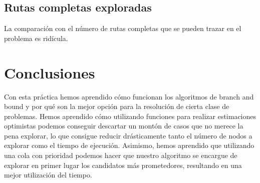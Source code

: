 \documentclass[a4paper, 11pt]{article}
\begin{document}
\subsection{Rutas completas exploradas}
La comparación con el número de rutas completas que se pueden trazar en el problema es ridícula.

\section{Conclusiones}
Con esta práctica hemos aprendido cómo funcionan los algoritmos de branch and bound y por qué son la mejor opción para la resolución de cierta clase de problemas. Hemos aprendido cómo utilizando funciones para realizar estimaciones optimistas podemos conseguir descartar un montón de casos que no merece la pena explorar, lo que consigue reducir drásticamente tanto el número de nodos a explorar como el tiempo de ejecución. Asimismo, hemos aprendido que utilizando una cola con prioridad podemos hacer que nuestro algoritmo se encargue de explorar en primer lugar los candidatos más prometedores, resultando en una mejor utilización del tiempo.
\end{document}
